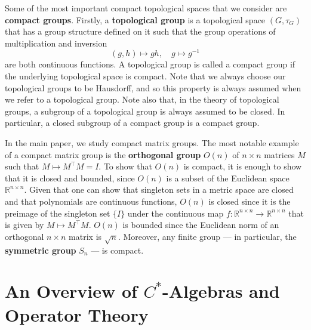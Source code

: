 \documentclass{article}
\theoremstyle{plain}
\theoremstyle{definition}
\theoremstyle{remark}
\begin{document}
Some of the most important compact topological spaces that we consider
are \textbf{compact groups}.
Firstly, a \textbf{topological group} is 
a topological space $(G, \tau_G)$ that has a group structure defined on it
such that the group operations of multiplication and inversion
\begin{equation}
	(g, h) \mapsto gh, \quad g \mapsto g^{-1}	
\end{equation}
are both continuous functions.
A topological group is called a compact group
if the underlying topological space is compact.
Note that we always choose our topological groups to be Hausdorff, 
and so this property is always assumed when we refer to a topological group.
Note also that, in the theory of topological groups, a subgroup
of a topological group is always assumed to be closed.
In particular, a closed subgroup of a compact group is a compact group.

In the main paper, we study compact matrix groups.
The most notable example of a compact matrix group is
the \textbf{orthogonal group} $O(n)$ of $n \times n$ matrices $M$ 
such that $M \mapsto M^\top{M} = I$.
To show that $O(n)$ is compact, it is enough to show that it is closed and bounded,
since $O(n)$ is a subset of the Euclidean space $\mathbb{R}^{n \times n}$.
Given that one can show that singleton sets in a metric space are closed 
and that polynomials are continuous functions,
$O(n)$ is closed since it is the preimage 
of the singleton set $\{I\}$ 
under the continuous map 
$f : \mathbb{R}^{n \times n} \rightarrow \mathbb{R}^{n \times n}$
that is given by $M \mapsto M^\top{M}$.
$O(n)$ is bounded since the Euclidean norm of an orthogonal $n \times n$ matrix
is $\sqrt{n}$.
Moreover, any finite group --- in particular, 
the \textbf{symmetric group} $S_n$ ---
is compact.


\section{An Overview of $C^{*}$-Algebras and Operator Theory} \label{Cstarbackground}
\end{document}
